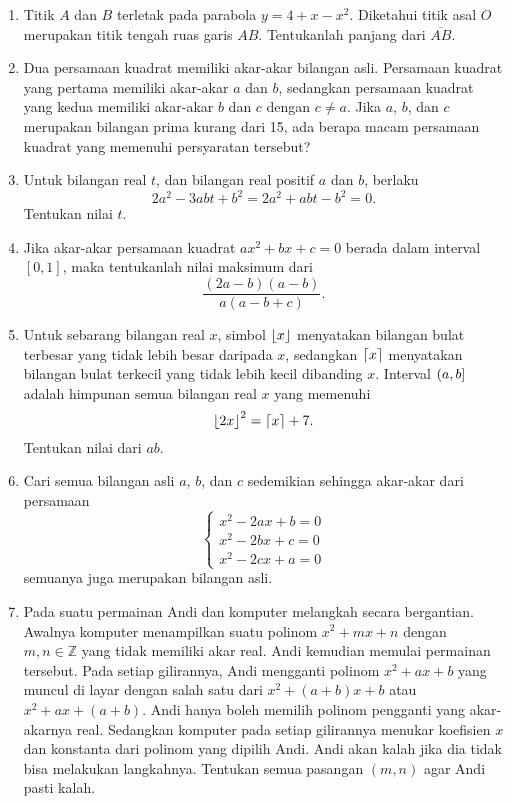 \begin{enumerate}[topsep=0pt]
		\item Titik $ A $ dan $ B $ terletak pada parabola $ y = 4 + x - x^{2} $. Diketahui titik asal $ O $ merupakan titik tengah ruas garis $ AB $. Tentukanlah panjang dari $ \overline{AB} $.
		\item Dua persamaan kuadrat memiliki akar-akar bilangan asli. Persamaan kuadrat yang pertama memiliki akar-akar $ a $ dan $ b $, sedangkan persamaan kuadrat yang kedua memiliki akar-akar $ b $ dan $ c $ dengan $ c \ne a $. Jika $ a $, $ b $, dan $ c $ merupakan bilangan prima kurang dari 15, ada berapa macam persamaan kuadrat yang memenuhi persyaratan tersebut?
		\item Untuk bilangan real $ t $, dan bilangan real positif $ a $ dan $ b $, berlaku
		\[ 2a^{2} - 3abt + b^{2} = 2a^{2} + abt - b^{2} = 0. \]
		Tentukan nilai $ t $.
		\item \probtype{*} Jika akar-akar persamaan kuadrat $ ax^{2} + bx + c = 0 $ berada dalam interval $ \left[0, 1\right] $, maka tentukanlah nilai maksimum dari
		\[ \frac{\left(2a - b\right)\left(a - b\right)}{a\left(a - b + c\right)}. \]
		\item \probtype{*} Untuk sebarang bilangan real $ x $, simbol $ \mathop{}\!\left\lfloor{x}\right\rfloor $ menyatakan bilangan bulat terbesar yang tidak lebih besar daripada $ x $, sedangkan $ \mathop{}\!\left\lceil{x}\right\rceil $ menyatakan bilangan bulat terkecil yang tidak lebih kecil dibanding $ x $. Interval $ \mathop{}\!\left({a, b}\right] $ adalah himpunan semua bilangan real $ x $ yang memenuhi
		\[ \mathop{}\!\left\lfloor{2x}\right\rfloor^{2} = \mathop{}\!\left\lceil{x}\right\rceil + 7. \]
		Tentukan nilai dari $ ab $.
		\item \probtype{*} Cari semua bilangan asli $ a $, $ b $, dan $ c $ sedemikian sehingga akar-akar dari persamaan
		\[
			\begin{cases}
				x^{2} - 2ax + b = 0 \\
				x^{2} - 2bx + c = 0 \\
				x^{2} - 2cx + a = 0
			\end{cases}
		\]
		semuanya juga merupakan bilangan asli.
		\item \probtype{**} Pada suatu permainan Andi dan komputer melangkah secara bergantian. Awalnya komputer menampilkan suatu polinom $ x^{2} + mx + n $ dengan $ m, n \in \mathbb{Z} $ yang tidak memiliki akar real. Andi kemudian memulai permainan tersebut. Pada setiap gilirannya, Andi mengganti polinom $ x^{2} + ax + b $ yang muncul di layar dengan salah satu dari $ x^{2} + \left(a + b\right)x + b $ atau $ x^{2} + ax + \left(a + b\right) $. Andi hanya boleh memilih polinom pengganti yang akar-akarnya real. Sedangkan komputer pada setiap gilirannya menukar koefisien $ x $ dan konstanta dari polinom yang dipilih Andi. Andi akan kalah jika dia tidak bisa melakukan langkahnya. Tentukan semua pasangan $ \left(m, n\right) $ agar Andi pasti kalah.
		

\end{enumerate}
